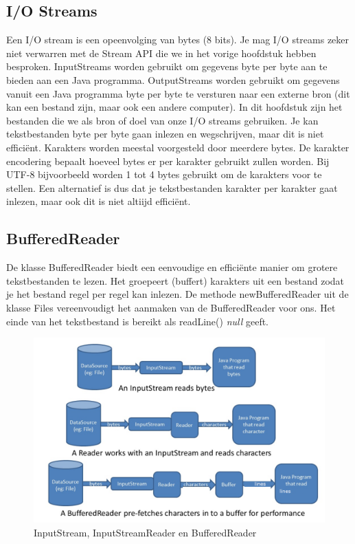 \documentclass{tstextbook}
\begin{document}
\subsection{I/O Streams}

Een I/O stream is een opeenvolging van bytes (8 bits). Je mag I/O streams zeker niet verwarren met de Stream API die we in het vorige hoofdstuk hebben besproken. InputStreams worden gebruikt om gegevens byte per byte aan te bieden aan een Java programma. OutputStreams worden gebruikt om gegevens vanuit een Java programma byte per byte te versturen naar een externe bron (dit kan een bestand zijn, maar ook een andere computer). 
In dit hoofdstuk zijn het bestanden die we als bron of doel van onze I/O streams gebruiken. Je kan tekstbestanden byte per byte gaan inlezen en wegschrijven, maar dit is niet effici\"ent. Karakters worden meestal voorgesteld door meerdere bytes. 
De karakter encodering bepaalt hoeveel bytes er per karakter gebruikt zullen worden. Bij UTF-8 bijvoorbeeld worden 1 tot 4 bytes gebruikt om de karakters voor te stellen. Een alternatief is dus dat je tekstbestanden karakter per karakter gaat inlezen, maar ook dit is niet altiijd effici\"ent.

\subsection{BufferedReader}

De klasse BufferedReader biedt een eenvoudige en effici\"ente manier om grotere tekstbestanden te lezen. Het groepeert (buffert) karakters uit een bestand zodat je het bestand regel per regel kan inlezen. De methode newBufferedReader uit de klasse Files vereenvoudigt het aanmaken van de BufferedReader voor ons.
Het einde van het tekstbestand is bereikt als readLine() \textit{null} geeft.

\begin{figure}[H]
  \includegraphics[width=\linewidth]{images/h8/stream_reader.png}
  \caption{InputStream, InputStreamReader en BufferedReader}
  \label{fig:paths}
\end{figure}
\end{document}
